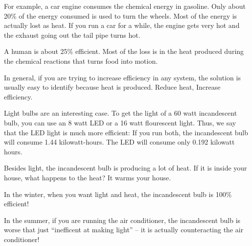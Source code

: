 For example, a car engine consumes the chemical energy in gasoline. Only
about 20\% of the energy consumed is used to turn the wheels.  Most of
the energy is actually lost as heat. If you run a car for a while, the engine
gets very hot and the exhaust going out the tail pipe turns hot.

A human is about 25\% efficient. Most of the loss is in the heat produced
during the chemical reactions that turns food into motion.
 
In general, if you are trying to increase efficiency in any system,
the solution is usually easy to identify because heat is produced. Reduce heat, Increase efficiency.

Light bulbs are an interesting case. To get the light of a 60 watt
incandescent bulb, you can use an 8 watt LED or a 16 watt flourescent
light. Thus, we say that the LED light is much more efficient: If you
run both, the incandescent bulb will consume 1.44 kilowatt-hours. The
LED will consume only 0.192 kilowatt hours.

Besides light, the incandescent bulb is producing a lot of heat. If it
is inside your house, what happens to the heat? It warms your house.

In the winter, when you want light and heat, the incandescent bulb is
100\% efficient!

In the summer, if you are running the air conditioner, the
incandescent bulb is worse that just ``inefficent at making light'' --
it is actually counteracting the air conditioner! 


